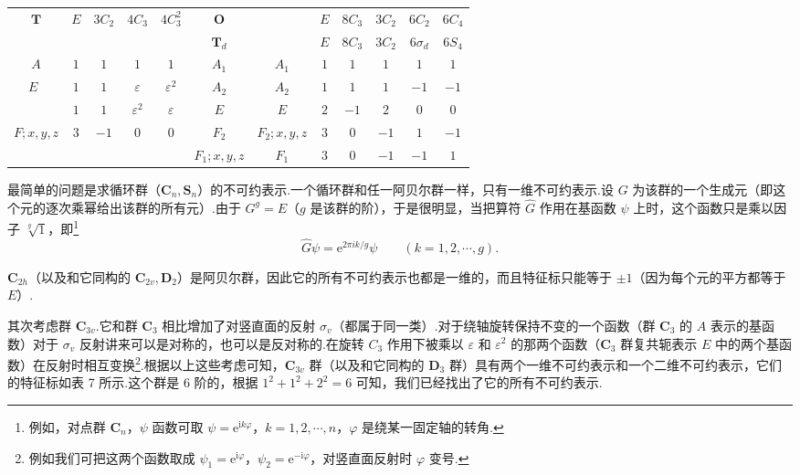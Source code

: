 \begin{center}
\begin{tabular}{c|cccc@{\qquad}cc|ccccc}
  $\boldsymbol{T}$ & $E$ & $3C_2$ & $4C_3$ & $4C_3^2$
  & $\boldsymbol{O}$ & & $E$ & $8C_3$ & $3C_2$ & $6C_2$ & $6C_4$\\
  & & & & & $\boldsymbol{T}_d$ & & $E$ & $8C_3$ & $3C_2$ & $6\sigma_d$ & $6S_4$\\
  \hline
  $A$ & $1$ & $1$ & $1$ & $1$
  & $A_1$ & $A_1$ & $1$ & $1$ & $1$ & $1$ & $1$\\
  $E$\ \smash{\raisebox{0.45em}{$\Bigg\}$}}
  & $1$ & $1$ & $\varepsilon$ & $\varepsilon^2$
  & $A_2$ & $A_2$ & $1$ & $1$ & $1$ & $-1$ & $-1$\\
  & $1$ & $1$ & $\varepsilon^2$ & $\varepsilon$
  & $E$ & $E$ & $2$ & $-1$ & $2$ & $0$ & $0$\\
  $F;x,y,z$ & $3$ & $-1$ & $0$ & $0$
  & $F_2$ & $F_2;x,y,z$ & $3$ & $0$ & $-1$ & $1$ & $-1$\\
  & & & & &$F_1;x,y,z$ & $F_1$ & $3$ & $0$ & $-1$ & $-1$ & $1$\\
\end{tabular}
\end{center}

最简单的问题是求循环群（$\boldsymbol{C}_n,\boldsymbol{S}_n$）的不可约表示.一个循环群和任一阿贝尔群一样，只有一维不可约表示.设 $G$ 为该群的一个生成元（即这个元的逐次乘幂给出该群的所有元）.由于 $G^g=E$（$g$ 是该群的阶），于是很明显，当把算符 $\hat{G}$ 作用在基函数 $\psi$ 上时，这个函数只是乘以因子 $\sqrt[g]{1}$，即\footnote{例如，对点群 $\boldsymbol{C}_n$，$\psi$ 函数可取 $\psi=\mathrm{e}^{\mathrm{i}k\varphi}$，$k=1,2,\cdots,n$，$\varphi$ 是绕某一固定轴的转角.}
\begin{equation*}
  \hat{G}\psi=\mathrm{e}^{2\pi ik/g}\psi\qquad(k=1,2,\cdots,g).
\end{equation*}

$\boldsymbol{C}_{2h}$（以及和它同构的 $\boldsymbol{C}_{2v},\boldsymbol{D}_2$）是阿贝尔群，因此它的所有不可约表示也都是一维的，而且特征标只能等于 $\pm1$（因为每个元的平方都等于 $E$）.

其次考虑群 $\boldsymbol{C}_{3v}$.它和群 $\boldsymbol{C}_3$ 相比增加了对竖直面的反射 $\sigma_v$（都属于同一类）.对于绕轴旋转保持不变的一个函数（群 $\boldsymbol{C}_3$ 的 $A$ 表示的基函数）对于 $\sigma_v$ 反射讲来可以是对称的，也可以是反对称的.在旋转 $C_3$ 作用下被乘以 $\varepsilon$ 和 $\varepsilon^2$ 的那两个函数（$\boldsymbol{C}_3$ 群复共轭表示 $E$ 中的两个基函数）在反射时相互变换\footnote{例如我们可把这两个函数取成 $\psi_1=\mathrm{e}^{\mathrm{i}\varphi}$，$\psi_2=\mathrm{e}^{-\mathrm{i}\varphi}$，对竖直面反射时 $\varphi$ 变号.}.根据以上这些考虑可知，$\boldsymbol{C}_{3v}$ 群（以及和它同构的 $\boldsymbol{D}_3$ 群）具有两个一维不可约表示和一个二维不可约表示，它们的特征标如表 7 所示.这个群是 6 阶的，根据 $1^2+1^2+2^2=6$ 可知，我们已经找出了它的所有不可约表示.

